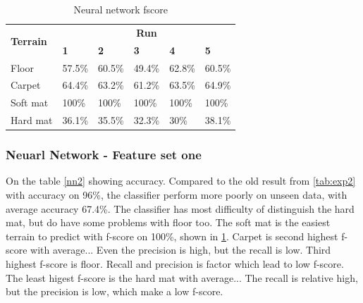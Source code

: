 \documentclass[USenglish]{ifimaster}  %
\begin{document}
\begin{table}[h]
	\centering
	\begin{tabular}{@{}llllll@{}}
		\toprule
		\multirow{2}{*}{\textbf{Terrain}} & \multicolumn{5}{c}{\textbf{Run}} \\ \cmidrule(l){2-6} 
		& \multicolumn{1}{l|}{\textbf{1}} & \multicolumn{1}{l|}{\textbf{2}} & \multicolumn{1}{l|}{\textbf{3}} & \multicolumn{1}{l|}{\textbf{4}} & \textbf{5} \\ \midrule
		\multicolumn{1}{l|}{Floor} & \multicolumn{1}{l|}{57.5\%} & \multicolumn{1}{l|}{60.5\%} & \multicolumn{1}{l|}{49.4\%} & \multicolumn{1}{l|}{62.8\%} & 60.5\% \\ \midrule
		\multicolumn{1}{l|}{Carpet} & \multicolumn{1}{l|}{64.4\%} & \multicolumn{1}{l|}{63.2\%} & \multicolumn{1}{l|}{61.2\%} & \multicolumn{1}{l|}{63.5\%} & 64.9\% \\ \midrule
		\multicolumn{1}{l|}{Soft mat} & \multicolumn{1}{l|}{100\%} & \multicolumn{1}{l|}{100\%} & \multicolumn{1}{l|}{100\%} & \multicolumn{1}{l|}{100\%} & 100\% \\ \midrule
		\multicolumn{1}{l|}{Hard mat} & \multicolumn{1}{l|}{36.1\%} & \multicolumn{1}{l|}{35.5\%} & \multicolumn{1}{l|}{32.3\%} & \multicolumn{1}{l|}{30\%} & 38.1\% \\ \bottomrule
	\end{tabular}
	\caption{Neural network fscore}
	\label{nnfscore}
\end{table}
\FloatBarrier

\subsubsection{Neuarl Network - Feature set one}
On the table \ref{nn2} showing accuracy. Compared to the old result from \ref{tab:exp2} with accuracy on 96\%, the classifier perform more poorly on unseen data, with average accuracy 67.4\%. The classifier has most difficulty of distinguish the hard mat, but do have some problems with floor too. The soft mat is the easiest terrain to predict with f-score on 100\%, shown in \ref{nnfscore}. Carpet is second highest f-score with average... Even the precision is high, but the recall is low. Third highest f-score is floor. Recall and precision is factor which lead to low f-score. The least higest f-score is the hard mat with average... The recall is relative high, but the precision is low, which make a low f-score.
\end{document}
